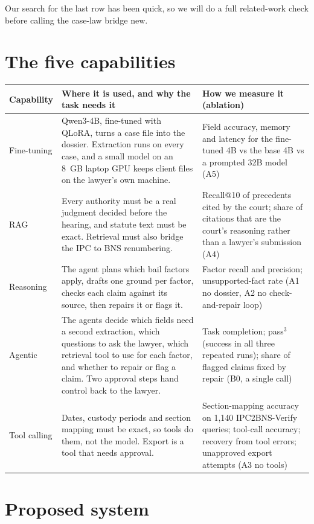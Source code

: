 \documentclass[11pt,a4paper]{article}
\begin{document}
Our search for the last row has been quick, so we will do a full related-work check before calling the case-law bridge new.

\section{The five capabilities}

{\small
\begin{xltabular}{\linewidth}{@{}P{2.1cm}L P{5.4cm}@{}}
\toprule
\textbf{Capability} & \textbf{Where it is used, and why the task needs it} & \textbf{How we measure it (ablation)} \\
\midrule
\endhead
Fine-tuning & Qwen3-4B, fine-tuned with QLoRA, turns a case file into the dossier. Extraction runs on every case, and a small model on an 8~GB laptop GPU keeps client files on the lawyer's own machine. & Field accuracy, memory and latency for the fine-tuned 4B vs the base 4B vs a prompted 32B model (A5) \\
RAG & Every authority must be a real judgment decided before the hearing, and statute text must be exact. Retrieval must also bridge the IPC to BNS renumbering. & Recall@10 of precedents cited by the court; share of citations that are the court's reasoning rather than a lawyer's submission (A4) \\
Reasoning & The agent plans which bail factors apply, drafts one ground per factor, checks each claim against its source, then repairs it or flags it. & Factor recall and precision; unsupported-fact rate (A1 no dossier, A2 no check-and-repair loop) \\
Agentic & The agents decide which fields need a second extraction, which questions to ask the lawyer, which retrieval tool to use for each factor, and whether to repair or flag a claim. Two approval steps hand control back to the lawyer. & Task completion; pass$^3$ (success in all three repeated runs); share of flagged claims fixed by repair (B0, a single call) \\
Tool calling & Dates, custody periods and section mapping must be exact, so tools do them, not the model. Export is a tool that needs approval. & Section-mapping accuracy on 1,140 IPC2BNS-Verify queries; tool-call accuracy; recovery from tool errors; unapproved export attempts (A3 no tools) \\
\bottomrule
\end{xltabular}}

\section{Proposed system}
\end{document}
